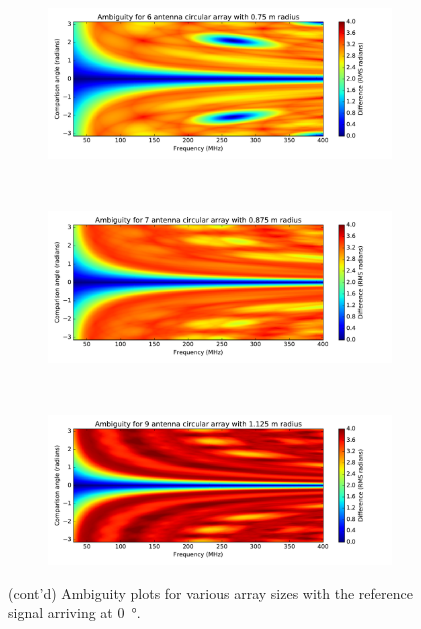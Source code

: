 \begin{figure}[H]
  \ContinuedFloat
  \centering
  \begin{subfigure}{0.95\textwidth}
    \centering
    \includegraphics[width=\textwidth, clip=true, trim = 10 15 53 0]{ambiguity06}
  \end{subfigure}\\[1em]
  \begin{subfigure}{\textwidth}
    \centering
    \includegraphics[width=\textwidth, clip=true, trim = 10 15 53 0]{ambiguity07}
  \end{subfigure}\\[1em]
  \begin{subfigure}{\textwidth}
    \centering
    \includegraphics[width=\textwidth, clip=true, trim = 10 15 53 0]{ambiguity09}
  \end{subfigure}
  \caption{(cont'd) Ambiguity plots for various array sizes with the reference signal arriving at \SI{0}{\degree}.}
\end{figure}

